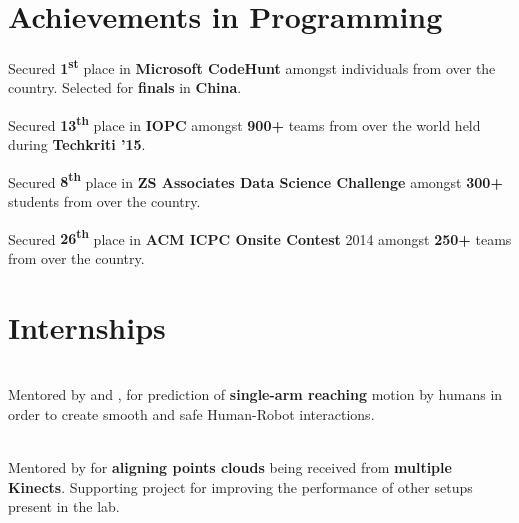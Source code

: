 \documentclass[a4paper]{norm-resume}
\begin{document}
\vspace{0mm}	%


\section{Achievements in Programming \hrulefill}

\vspace{3mm} %

\begin{tightitemize}
	\item Secured \textbf{1\textsuperscript{st}} place in \textbf{Microsoft CodeHunt} amongst individuals from over the country. Selected for \textbf{finals} in \textbf{China}.
	\item Secured \textbf{13\textsuperscript{th}} place in \textbf{IOPC} amongst \textbf{900+} teams from over the world held during \textbf{Techkriti '15}.
	\item Secured \textbf{8\textsuperscript{th}} place in \textbf{ZS Associates Data Science Challenge} amongst \textbf{300+} students from over the country.
	\item Secured \textbf{26\textsuperscript{th}} place in \textbf{ACM ICPC Onsite Contest} 2014 amongst \textbf{250+} teams from over the country.
\end{tightitemize}

\vspace{-1mm}	%


\section{Internships \hrulefill}
		
\vspace{2mm} %

 	
\location{}

\vspace{-3mm} %

	\begin{changemargin}{0.7cm}{0.0cm} 
	{
	\large{}  \\
	\small{Mentored by  and , for prediction of \textbf{single-arm reaching} motion by humans in order to create smooth and safe Human-Robot interactions.}

	\vspace{-1mm} %

	\large{} \\
	\small{Mentored by  for \textbf{aligning points clouds} being received from \textbf{multiple Kinects}. Supporting project for improving the performance of other setups present in the lab.}

	}
	\end{changemargin} 
			
\end{document}
